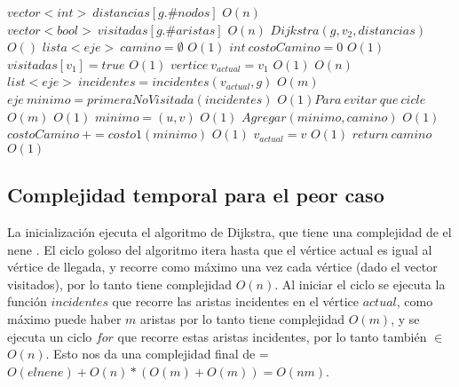 \begin{algorithmic}


\State $vector<int> \: distancias[g.\#nodos]$
\Comment $ O(n) $
\State $vector<bool> \: visitadas[g.\#aristas]$
\Comment $ O(n) $
\State $ Dijkstra( g, v_2, distancias) $
\Comment $ O() $
\State $lista<eje> \: camino= \emptyset$
\Comment $ O(1) $
\State $ int \: costoCamino = 0 $
\Comment $ O(1) $
\State $ visitadas[v_1] = true $
\Comment $ O(1) $
\State $ vertice \: v_{actual} = v_1 $
\Comment $ O(1) $
\Comment $ O(n) $
	\State $ list<eje> \: incidentes = incidentes(v_{actual}, g) $
	\Comment $ O(m) $
	\State $ eje \:	 minimo = primeraNoVisitada(incidentes) $
	\Comment $ O(1) Para\: evitar \:que \:cicle $
	\Comment $ O(m) $
		\Comment $ O(1) $
			\State $ minimo = (u,v) $
			\Comment $ O(1) $
		\EndIf
	\EndFor
	\State $ Agregar(minimo, camino) $
	\Comment $ O(1) $
	\State $ costoCamino \: += costo1(minimo) $
	\Comment $ O(1) $
	\State $ v_{actual} = v $
	\Comment $ O(1) $
\EndWhile
\State $ return \: camino $
\Comment $ O(1) $

\EndProcedure

\end{algorithmic}



\subsection{Complejidad temporal para el peor caso}

La inicializaci\'on ejecuta el algoritmo de Dijkstra, que tiene una complejidad de el nene . El ciclo goloso del algoritmo itera hasta que el v\'ertice actual es igual al v\'ertice de llegada, y recorre como m\'aximo una vez cada v\'ertice (dado el vector visitados), por lo tanto tiene complejidad $O(n)$. Al iniciar el ciclo se ejecuta la funci\'on $incidentes$ que recorre las aristas incidentes en el v\'ertice $actual$, como m\'aximo puede haber $m$ aristas por lo tanto tiene complejidad $O(m)$, y se ejecuta un ciclo $for$ que recorre estas aristas incidentes, por lo tanto tambi\'en $\in$ $O(n)$. Esto nos da una complejidad final de = $ O(el nene)+ O(n)*(O(m)+O(m)) = O(nm)$. 

